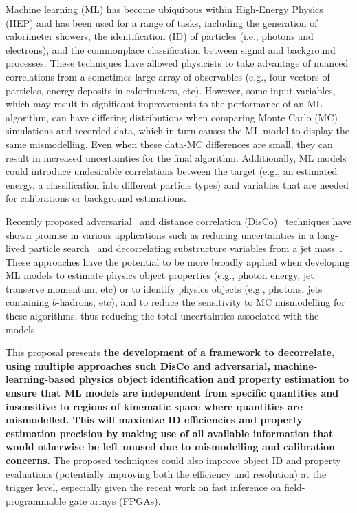 \documentclass[letter, USenglish, 11pt, subfigure]{article}
\begin{document}
Machine learning (ML) has become ubiquitous within High-Energy Physics (HEP) and has been used for a range of tasks, including the generation of calorimeter showers, the identification (ID) of particles (i.e., photons and electrons), and the commonplace classification between signal and background processes. These techniques have allowed physicists to take advantage of nuanced correlations from a sometimes large array of observables (e.g., four vectors of particles, energy deposits in calorimeters, etc). However, some input variables, which may result in significant improvements to the performance of an ML algorithm, can have differing distributions when comparing Monte Carlo (MC) simulations and recorded data, which in turn causes the ML model to display the same mismodelling. Even when these data-MC differences are small, they can result in increased uncertainties for the final algorithm. Additionally, ML models could introduce undesirable correlations between the target (e.g., an estimated energy, a classification into different particle types) and variables that are needed for calibrations or background estimations.

Recently proposed adversarial~\cite{louppe2017learning} and distance correlation (DisCo)~\cite{PhysRevLett.125.122001} techniques have shown promise in various applications such as reducing uncertainties in a long-lived particle search~\cite{calRatio}  and decorrelating substructure variables from a jet mass~\cite{ATL-PHYS-PUB-2018-014}. These approaches have the potential to be more broadly applied when developing ML models to estimate physics object properties (e.g., photon energy, jet transerve momentum, etc) or to identify physics objects (e.g., photons, jets containing $b$-hadrons, etc), and to reduce the sensitivity to MC mismodelling for these algorithms, thus reducing the total uncertainties associated with the models. 

This proposal presents {\bf the development of a framework to decorrelate, using multiple approaches such DisCo and adversarial, machine-learning-based physics object identification and property estimation to ensure that ML models are independent from specific quantities and insensitive to regions of kinematic space where quantities are mismodelled. This will maximize ID efficiencies and property estimation precision by making use of all available information that would otherwise be left unused due to mismodelling and calibration concerns.} The proposed techniques could also improve object ID and property evaluations (potentially improving both the efficiency and resolution) at the trigger level, especially given the recent work on fast inference on field-programmable gate arrays (FPGAs).
\end{document}
